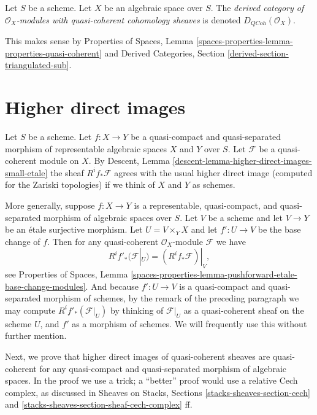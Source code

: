 \begin{definition}
\label{definition-derived-quasi-coherent}
Let $S$ be a scheme. Let $X$ be an algebraic space over $S$.
The {\it derived category of $\mathcal{O}_X$-modules with
quasi-coherent cohomology sheaves} is denoted
$D_{QCoh}(\mathcal{O}_X)$.
\end{definition}

\noindent
This makes sense by
Properties of Spaces, Lemma
\ref{spaces-properties-lemma-properties-quasi-coherent}
and
Derived Categories, Section \ref{derived-section-triangulated-sub}.








\section{Higher direct images}
\label{section-higher-direct-image}

\noindent
Let $S$ be a scheme. Let $f : X \to Y$ be a quasi-compact and quasi-separated
morphism of representable algebraic spaces $X$ and $Y$ over $S$. Let
$\mathcal{F}$ be a quasi-coherent module on $X$. By
Descent, Lemma \ref{descent-lemma-higher-direct-images-small-etale}
the sheaf $R^if_*\mathcal{F}$ agrees with the
usual higher direct image (computed for the Zariski topologies)
if we think of $X$ and $Y$ as schemes.

\medskip\noindent
More generally, suppose $f : X \to Y$ is a representable, quasi-compact, and
quasi-separated morphism of algebraic spaces over $S$. Let $V$ be a scheme
and let $V \to Y$ be an \'etale surjective morphism. Let $U = V \times_Y X$
and let $f' : U \to V$ be the base change of $f$. Then for any
quasi-coherent $\mathcal{O}_X$-module $\mathcal{F}$ we have
\begin{equation}
\label{equation-representable-higher-direct-image}
R^if'_*(\mathcal{F}|_U) = (R^if_*\mathcal{F})|_V,
\end{equation}
see
Properties of Spaces,
Lemma \ref{spaces-properties-lemma-pushforward-etale-base-change-modules}.
And because $f' : U \to V$ is a quasi-compact and quasi-separated
morphism of schemes, by the remark of the preceding paragraph we may
compute $R^if'_*(\mathcal{F}|_U)$ by thinking of $\mathcal{F}|_U$ as a
quasi-coherent sheaf on the scheme $U$, and $f'$ as a morphism of schemes.
We will frequently use this without further mention.

\medskip\noindent
Next, we prove that higher direct images of quasi-coherent sheaves are
quasi-coherent for any quasi-compact and quasi-separated morphism of
algebraic spaces. In the proof we use a trick; a ``better'' proof would
use a relative Cech complex, as discussed in
Sheaves on Stacks, Sections \ref{stacks-sheaves-section-cech} and
\ref{stacks-sheaves-section-sheaf-cech-complex} ff.

